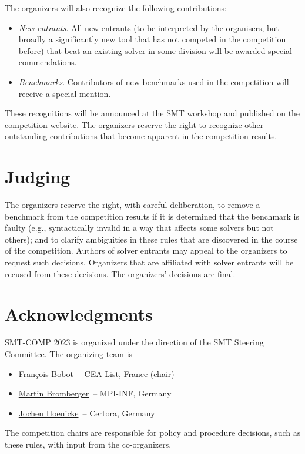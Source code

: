 \documentclass[12pt]{article}
\begin{document}
The organizers will also recognize the following contributions:
%
\begin{itemize}
\item \emph{New entrants}. All new entrants (to be interpreted by the organisers, but broadly a significantly new tool that has not competed in the competition before) that beat an existing solver in some division will be awarded special commendations.
\item \emph{Benchmarks}. Contributors of new benchmarks used in the competition will receive a special mention.
\end{itemize}
%
These recognitions will be announced at the SMT workshop and published on the competition website.
The organizers reserve the right to recognize other outstanding
contributions that become apparent in the competition results.



\section{Judging}

The organizers reserve the right, with careful deliberation, to remove
a benchmark from the competition results if it is determined that the
benchmark is faulty (e.g., syntactically invalid in a way that affects
some solvers but not others); and to clarify ambiguities in these
rules that are discovered in the course of the competition.  Authors
of solver entrants may appeal to the organizers to request such
decisions.  Organizers that are affiliated with solver entrants will
be recused from these decisions.  The organizers' decisions are final.


\section{Acknowledgments}

SMT-COMP 2023 is organized under the direction of the SMT Steering
Committee. The organizing team is
%
\begin{itemize}
\setlength{\itemsep}{0pt}
\item \href{https://github.com/bobot}{Fran\c{c}ois Bobot}~-- CEA List, France (chair)
\item \href{https://www.mpi-inf.mpg.de/departments/automation-of-logic/people/martin-bromberger}{Martin Bromberger}~-- MPI-INF, Germany
\item \href{https://jochen-hoenicke.de/}{Jochen Hoenicke}~-- Certora, Germany
\end{itemize}
%
The competition chairs are responsible for policy and procedure decisions,
such as these rules, with input from the co-organizers.
\end{document}
